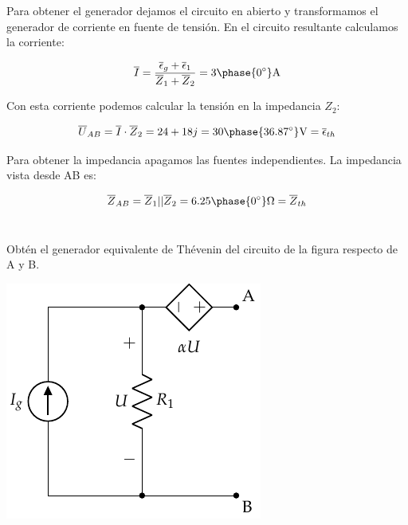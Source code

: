 \documentclass[12pt]{article}
\begin{document}
\noindent\hrulefill

Para obtener el generador dejamos el circuito en abierto y transformamos el generador de corriente en fuente de tensión. En el circuito resultante calculamos la corriente:

\begin{equation*}
  \overline{I} = \frac{\overline{\epsilon}_g + \overline{\epsilon}_1}{\overline{Z}_1 + \overline{Z}_2} = 3\phase{\ang{0}}\si{\ampere} 
\end{equation*}

Con esta corriente podemos calcular la tensión en la impedancia $Z_2$:

\begin{equation*}
  \overline{U}_{AB} = \overline{I} \cdot \overline{Z}_2 = 24 + 18j = 30\phase{\ang{36.87}}\si{\volt} = \overline{\epsilon}_{th}
\end{equation*}

Para obtener la impedancia apagamos las fuentes independientes. La impedancia vista desde AB es:

\begin{equation*}
  \overline{Z}_{AB} = \overline{Z}_1 || \overline{Z}_2 = 6.25\phase{\ang{0}}\si{\ohm} = \overline{Z}_{th}
\end{equation*}


\clearpage

\section{}

Obtén el generador equivalente de Thévenin del circuito de la figura respecto de A y B.
\begin{center}
\includegraphics{figs/Thevenin1}
\end{center}
\end{document}
